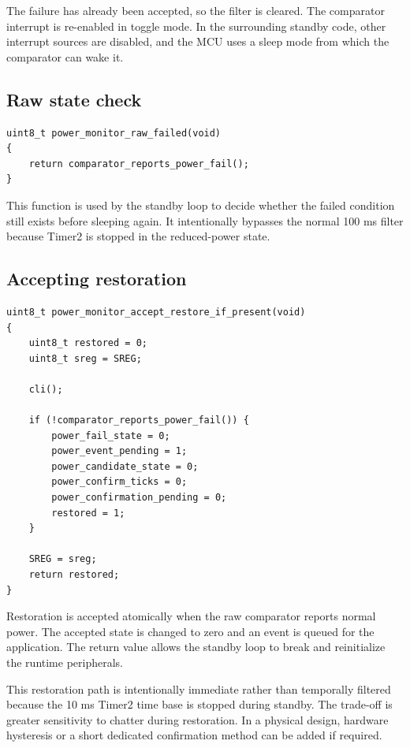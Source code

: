 \documentclass[11pt,a4paper]{article}
\begin{document}
The failure has already been accepted, so the filter is cleared. The comparator interrupt is re-enabled in toggle mode. In the surrounding standby code, other interrupt sources are disabled, and the MCU uses a sleep mode from which the comparator can wake it.

\subsection{Raw state check}

\begin{lstlisting}[style=cstyle]
uint8_t power_monitor_raw_failed(void)
{
    return comparator_reports_power_fail();
}
\end{lstlisting}

This function is used by the standby loop to decide whether the failed condition still exists before sleeping again. It intentionally bypasses the normal 100 ms filter because Timer2 is stopped in the reduced-power state.

\subsection{Accepting restoration}

\begin{lstlisting}[style=cstyle]
uint8_t power_monitor_accept_restore_if_present(void)
{
    uint8_t restored = 0;
    uint8_t sreg = SREG;

    cli();

    if (!comparator_reports_power_fail()) {
        power_fail_state = 0;
        power_event_pending = 1;
        power_candidate_state = 0;
        power_confirm_ticks = 0;
        power_confirmation_pending = 0;
        restored = 1;
    }

    SREG = sreg;
    return restored;
}
\end{lstlisting}

Restoration is accepted atomically when the raw comparator reports normal power. The accepted state is changed to zero and an event is queued for the application. The return value allows the standby loop to break and reinitialize the runtime peripherals.

This restoration path is intentionally immediate rather than temporally filtered because the 10 ms Timer2 time base is stopped during standby. The trade-off is greater sensitivity to chatter during restoration. In a physical design, hardware hysteresis or a short dedicated confirmation method can be added if required.
\end{document}
